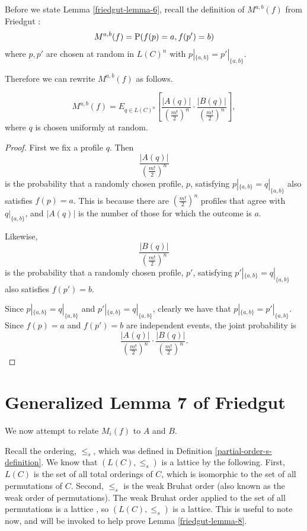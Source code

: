 	Before we state Lemma \ref{friedgut-lemma-6}, recall the definition of $M^{a,b}(f)$ from Friedgut \cite{friedgut2008elections}:
	\[
		M^{a,b}(f) = \operatorname{P}(f(p) = a, f(p') = b)
	\]
	where $p, p'$ are chosen at random in $L(C)^n$ with $p|_{\{a,b\}} = p'|_{\{a,b\}}$.

	Therefore we can rewrite $M^{a,b}(f)$ as follows.

	\begin{lemma}
		\label{friedgut-lemma-6}
		\[
			M^{a,b}(f) = E_{q \in L(C)^n} \left[ \frac{|A(q)|}{\left(\frac{m!}{2}\right)^n} \cdot \frac{|B(q)|}{\left(\frac{m!}{2}\right)^n} \right],
		\]
		where $q$ is chosen uniformly at random.
	\end{lemma}
	\begin{proof}
		First we fix a profile $q$. Then
		\[
			\frac{|A(q)|}{\left(\frac{m!}{2}\right)^n}
		\]
		is the probability that a randomly chosen profile, $p$, satisfying $p|_{\{a,b\}} = q|_{\{a,b\}}$ also satisfies $f(p) = a$. This is because there are $(\frac{m!}{2})^n$ profiles that agree with $q|_{\{a,b\}}$, and $|A(q)|$ is the number of those for which the outcome is $a$.

		Likewise,
		\[
			\frac{|B(q)|}{\left(\frac{m!}{2}\right)^n}
		\]
		is the probability that a randomly chosen profile, $p'$, satisfying $p'|_{\{a,b\}} = q|_{\{a,b\}}$ also satisfies $f(p') = b$.

		Since $p|_{\{a,b\}} = q|_{\{a,b\}}$ and $p'|_{\{a,b\}} = q|_{\{a,b\}}$, clearly we have that $p|_{\{a,b\}} = p'|_{\{a,b\}}$. Since $f(p) = a$ and $f(p') = b$ are independent events, the joint probability is
		\[
			\frac{|A(q)|}{\left(\frac{m!}{2}\right)^n} \cdot \frac{|B(q)|}{\left(\frac{m!}{2}\right)^n}.
		\]
	\end{proof}


\section{Generalized Lemma 7 of Friedgut}

	We now attempt to relate $M_i(f)$ to $A$ and $B$.

	Recall the ordering, $\le_s$, which was defined in Definition \ref{partial-order-s-definition}. We know that $(L(C), \le_s)$ is a lattice by the following. First, $L(C)$ is the set of all total orderings of $C$, which is isomorphic to the set of all permutations of $C$. Second, $\le_s$ is the weak Bruhat order (also known as the weak order of permutations). The weak Bruhat order applied to the set of all permutations is a lattice \cite{bjorner1984orderings}, so $(L(C), \le_s)$ is a lattice. This is useful to note now, and will be invoked to help prove Lemma \ref{friedgut-lemma-8}.

